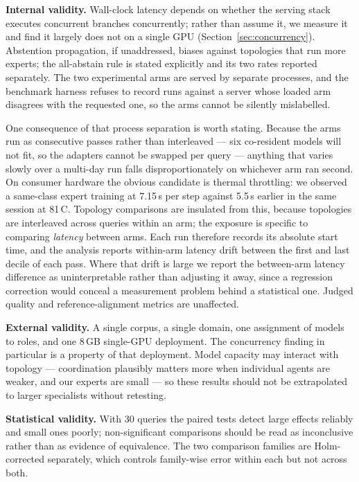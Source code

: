 \documentclass[journal,10pt,compsoc,onecolumn]{IEEEtran}
\begin{document}
\textbf{Internal validity.} Wall-clock latency depends on whether the serving
stack executes concurrent branches concurrently; rather than assume it, we measure
it and find it largely does not on a single GPU
(Section~\ref{sec:concurrency}). Abstention propagation, if unaddressed, biases
against topologies that run more experts; the all-abstain rule is stated
explicitly and its two rates reported separately. The two experimental arms are
served by separate processes, and the benchmark harness refuses to record runs
against a server whose loaded arm disagrees with the requested one, so the arms
cannot be silently mislabelled.

One consequence of that process separation is worth stating. Because the arms run
as consecutive passes rather than interleaved --- six co-resident models will not
fit, so the adapters cannot be swapped per query --- anything that varies slowly
over a multi-day run falls disproportionately on whichever arm ran second. On
consumer hardware the obvious candidate is thermal throttling: we observed a
same-class expert training at 7.15\,s per step against 5.5\,s earlier in the same
session at 81\,\textdegree C. Topology comparisons are insulated from this,
because topologies are interleaved across queries within an arm; the exposure is
specific to comparing \emph{latency} between arms. Each run therefore records its
absolute start time, and the analysis reports within-arm latency drift between
the first and last decile of each pass. Where that drift is large we report the
between-arm latency difference as uninterpretable rather than adjusting it away,
since a regression correction would conceal a measurement problem behind a
statistical one. Judged quality and reference-alignment metrics are unaffected.

\textbf{External validity.} A single corpus, a single domain, one assignment of
models to roles, and one 8\,GB single-GPU deployment. The concurrency finding in
particular is a property of that deployment. Model capacity may interact with
topology --- coordination plausibly matters more when individual agents are
weaker, and our experts are small --- so these results should not be extrapolated
to larger specialists without retesting.

\textbf{Statistical validity.} With 30 queries the paired tests detect large
effects reliably and small ones poorly; non-significant comparisons should be
read as inconclusive rather than as evidence of equivalence. The two comparison
families are Holm-corrected separately, which controls family-wise error within
each but not across both.
\end{document}
